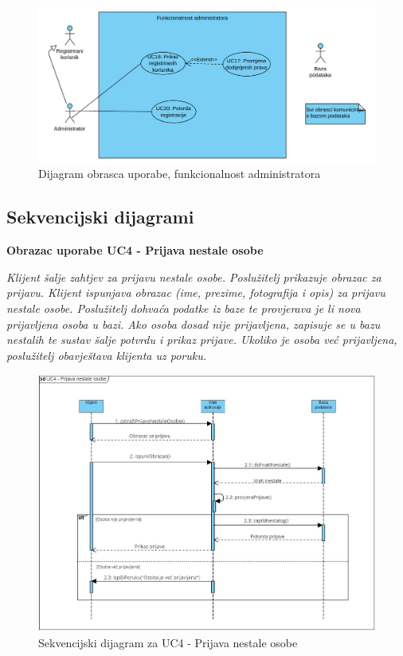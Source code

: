 				    \begin{figure}[H] \includegraphics[width=\linewidth]{dijagrami/UML3.vpd.jpg} 
				    \caption{Dijagram obrasca uporabe, funkcionalnost administratora}
				    \end{figure} 
					
				\eject		
				
				\subsection{Sekvencijski dijagrami}
				
				\textbf{Obrazac uporabe UC4 - Prijava nestale osobe}
    
                \textit{Klijent šalje zahtjev za prijavu nestale osobe. Poslužitelj prikazuje obrazac za prijavu. Klijent ispunjava obrazac (ime, prezime, fotografija i opis) za prijavu nestale osobe. Poslužitelj dohvaća podatke iz baze te provjerava je li nova prijavljena osoba u bazi. Ako osoba dosad nije prijavljena, zapisuje se u bazu nestalih te sustav šalje potvrdu i prikaz prijave. Ukoliko je osoba već prijavljena, poslužitelj obavještava klijenta uz poruku.}

                \begin{figure}[H] \includegraphics[width=\linewidth]{./dijagrami/PrijavaNestalog.jpg}
				    \caption{Sekvencijski dijagram za UC4 - Prijava nestale osobe}
				    \end{figure}

